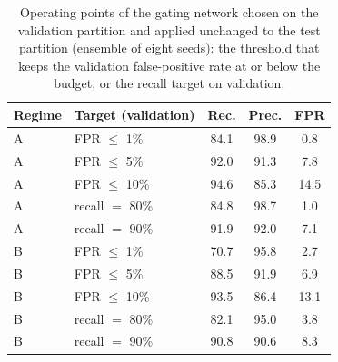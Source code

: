 \begin{table}[t]
\centering
\caption{Operating points of the gating network chosen on the validation partition and applied unchanged to the test partition (ensemble of eight seeds): the threshold that keeps the validation false-positive rate at or below the budget, or the recall target on validation.}
\label{tab:operating-points}
\footnotesize
\begin{tabular}{llccc}
\toprule
\textbf{Regime} & \textbf{Target (validation)} & \textbf{Rec.} & \textbf{Prec.} & \textbf{FPR} \\
\midrule
A & FPR $\leq$ 1\% & 84.1 & 98.9 & 0.8 \\
A & FPR $\leq$ 5\% & 92.0 & 91.3 & 7.8 \\
A & FPR $\leq$ 10\% & 94.6 & 85.3 & 14.5 \\
A & recall $=$ 80\% & 84.8 & 98.7 & 1.0 \\
A & recall $=$ 90\% & 91.9 & 92.0 & 7.1 \\
\midrule
B & FPR $\leq$ 1\% & 70.7 & 95.8 & 2.7 \\
B & FPR $\leq$ 5\% & 88.5 & 91.9 & 6.9 \\
B & FPR $\leq$ 10\% & 93.5 & 86.4 & 13.1 \\
B & recall $=$ 80\% & 82.1 & 95.0 & 3.8 \\
B & recall $=$ 90\% & 90.8 & 90.6 & 8.3 \\
\bottomrule
\end{tabular}
\end{table}